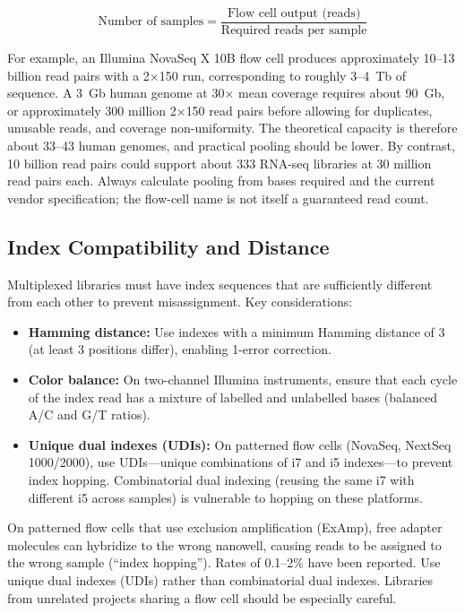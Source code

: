 \begin{equation}
\text{Number of samples} = \frac{\text{Flow cell output (reads)}}{\text{Required reads per sample}}
\end{equation}

For example, an Illumina NovaSeq X 10B flow cell produces approximately 10--13 billion read pairs with a 2$\times$150\basepair{} run, corresponding to roughly 3--4~Tb of sequence. A 3~Gb human genome at 30$\times$ mean coverage requires about 90~Gb, or approximately 300 million 2$\times$150 read pairs before allowing for duplicates, unusable reads, and coverage non-uniformity. The theoretical capacity is therefore about 33--43 human genomes, and practical pooling should be lower. By contrast, 10 billion read pairs could support about 333 RNA-seq libraries at 30 million read pairs each. Always calculate pooling from bases required and the current vendor specification; the flow-cell name is not itself a guaranteed read count.

\subsection{Index Compatibility and Distance}

Multiplexed libraries must have index sequences that are sufficiently different from each other to prevent misassignment. Key considerations:

\begin{itemize}[itemsep=2pt]
  \item \textbf{Hamming distance:} Use indexes with a minimum Hamming distance of 3 (at least 3 positions differ), enabling 1-error correction.
  \item \textbf{Color balance:} On two-channel Illumina instruments, ensure that each cycle of the index read has a mixture of labelled and unlabelled bases (balanced A/C and G/T ratios).
  \item \textbf{Unique dual indexes (UDIs):} On patterned flow cells (NovaSeq, NextSeq 1000/2000), use UDIs---unique combinations of i7 and i5 indexes---to prevent index hopping. Combinatorial dual indexing (reusing the same i7 with different i5 across samples) is vulnerable to hopping on these platforms.
\end{itemize}

\begin{warningbox}[title={Index Hopping on Patterned Flow Cells}]
On patterned flow cells that use exclusion amplification (ExAmp), free adapter molecules can hybridize to the wrong nanowell, causing reads to be assigned to the wrong sample (``index hopping''). Rates of 0.1--2\% have been reported. Use unique dual indexes (UDIs) rather than combinatorial dual indexes. Libraries from unrelated projects sharing a flow cell should be especially careful.
\end{warningbox}

